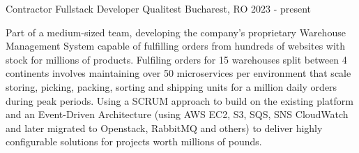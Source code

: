 \cventry
    {Contractor Fullstack Developer}
    {Qualitest} %
    {Bucharest, RO} %
    {2023 - present} %
    {\begin{cvitems}
         \item{Part of a medium-sized team, developing the company's proprietary Warehouse Management System
         capable of fulfilling orders from hundreds of websites with stock for millions of products. Fulfiling
         orders for 15 warehouses split between 4 continents involves maintaining over 50 microservices per environment
         that scale storing, picking, packing, sorting and shipping units for a million daily orders during peak
         periods. Using a SCRUM approach to build on the existing platform and an Event-Driven Architecture
             (using AWS EC2, S3, SQS, SNS CloudWatch and later migrated to Openstack, RabbitMQ and others)
             to deliver highly configurable solutions for projects worth millions of pounds.}
    \end{cvitems}}
